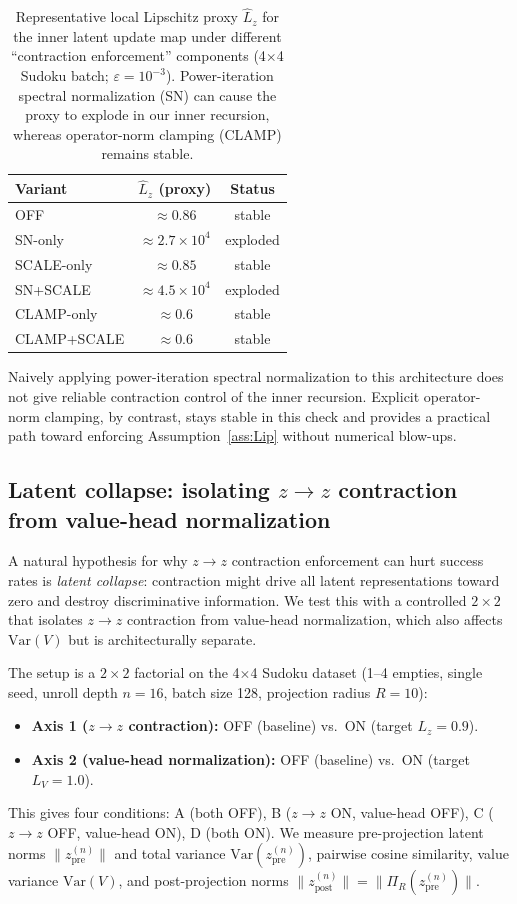 \documentclass{article}
\theoremstyle{plain}
\theoremstyle{definition}
\theoremstyle{remark}
\begin{document}
\begin{table}[t]
\caption{Representative local Lipschitz proxy $\hat L_z$ for the inner latent update map under different ``contraction enforcement'' components (4$\times$4 Sudoku batch; $\varepsilon=10^{-3}$). Power-iteration spectral normalization (SN) can cause the proxy to explode in our inner recursion, whereas operator-norm clamping (CLAMP) remains stable.}
\label{tab:sn_instability}
\centering
\small
\begin{tabular}{@{}lcc@{}}
\toprule
Variant & $\hat L_z$ (proxy) & Status \\
\midrule
OFF & $\approx 0.86$ & stable \\
SN-only & $\approx 2.7\times 10^4$ & exploded \\
SCALE-only & $\approx 0.85$ & stable \\
SN+SCALE & $\approx 4.5\times 10^4$ & exploded \\
CLAMP-only & $\approx 0.6$ & stable \\
CLAMP+SCALE & $\approx 0.6$ & stable \\
\bottomrule
\end{tabular}
\end{table}

Naively applying power-iteration spectral normalization to this architecture does not give reliable contraction control of the inner recursion. Explicit operator-norm clamping, by contrast, stays stable in this check and provides a practical path toward enforcing Assumption~\ref{ass:Lip} without numerical blow-ups.

\subsection{Latent collapse: isolating $z\!\to\!z$ contraction from value-head normalization}
\label{app:latent_collapse_diagnostic}

A natural hypothesis for why $z\!\to\!z$ contraction enforcement can hurt success rates is \emph{latent collapse}: contraction might drive all latent representations toward zero and destroy discriminative information.
We test this with a controlled $2\times 2$ that isolates $z\!\to\!z$ contraction from value-head normalization, which also affects $\mathrm{Var}(V)$ but is architecturally separate.

The setup is a $2\times 2$ factorial on the 4$\times$4 Sudoku dataset (1--4 empties, single seed, unroll depth $n{=}16$, batch size 128, projection radius $R{=}10$):
\begin{itemize}
\item \textbf{Axis 1 ($z\!\to\!z$ contraction):} OFF (baseline) vs.\ ON (target $L_z=0.9$).
\item \textbf{Axis 2 (value-head normalization):} OFF (baseline) vs.\ ON (target $L_V=1.0$).
\end{itemize}
This gives four conditions: A (both OFF), B ($z\!\to\!z$ ON, value-head OFF), C ($z\!\to\!z$ OFF, value-head ON), D (both ON).
We measure pre-projection latent norms $\|z^{(n)}_{\text{pre}}\|$ and total variance $\mathrm{Var}(z^{(n)}_{\text{pre}})$, pairwise cosine similarity, value variance $\mathrm{Var}(V)$, and post-projection norms $\|z^{(n)}_{\text{post}}\|=\|\Pi_R(z^{(n)}_{\text{pre}})\|$.
\end{document}
